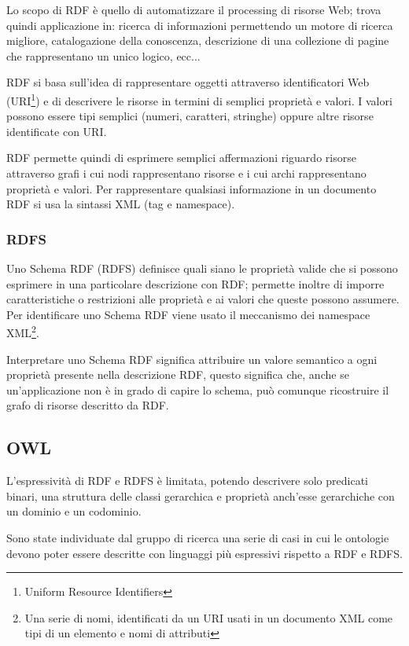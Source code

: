 Lo scopo di RDF è quello di automatizzare il processing di risorse Web; trova quindi applicazione in: ricerca di informazioni permettendo un motore di ricerca migliore, catalogazione della conoscenza, descrizione di una collezione di pagine che rappresentano un unico  logico, ecc...\cite{brickley1998resource}

RDF si basa sull'idea di rappresentare oggetti attraverso identificatori Web (URI\footnote{Uniform Resource Identifiers}) e di descrivere le risorse in termini di semplici proprietà e valori. I valori possono essere tipi semplici (numeri, caratteri, stringhe) oppure altre risorse identificate con URI.

RDF permette quindi di esprimere semplici affermazioni riguardo risorse attraverso grafi i cui nodi rappresentano risorse e i cui archi rappresentano proprietà e valori. Per rappresentare qualsiasi informazione in un documento RDF si usa la sintassi XML (tag e namespace)\cite{manola2004rdf}.
\subsubsection{RDFS}
Uno Schema RDF (RDFS) definisce quali siano le proprietà valide che si possono esprimere in una particolare descrizione con RDF; permette inoltre di imporre caratteristiche o restrizioni alle proprietà e ai valori che queste possono assumere. Per identificare uno Schema RDF viene usato il meccanismo dei namespace XML\footnote{Una serie di nomi, identificati da un URI usati in un documento XML come tipi di un elemento e nomi di attributi\cite{bray1999namespaces}}.

Interpretare uno Schema RDF significa attribuire un valore semantico a ogni proprietà presente nella descrizione RDF, questo significa che, anche se un'applicazione non è in grado di capire lo schema, può comunque ricostruire il grafo di risorse descritto da RDF\cite{miller1998introduction}.
\subsection{OWL}
L'espressività di RDF e RDFS è limitata, potendo descrivere solo predicati binari, una struttura delle classi gerarchica e proprietà anch'esse gerarchiche con un dominio e un codominio.

Sono state individuate dal gruppo di ricerca  una serie di casi in cui le ontologie devono poter essere descritte con linguaggi più espressivi rispetto a RDF e RDFS\cite{antoniou2009web}.

